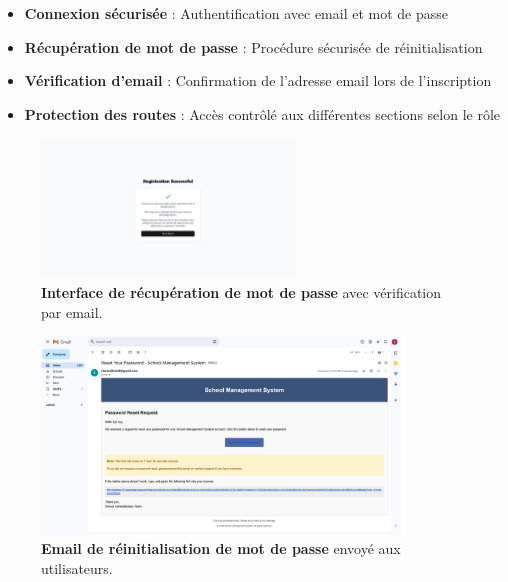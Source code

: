 \begin{itemize}
  \item \textbf{Connexion sécurisée} : Authentification avec email et mot de passe
  
  \item \textbf{Récupération de mot de passe} : Procédure sécurisée de réinitialisation
  
  \item \textbf{Vérification d'email} : Confirmation de l'adresse email lors de l'inscription
  
  \item \textbf{Protection des routes} : Accès contrôlé aux différentes sections selon le rôle
\end{itemize}

\begin{figure}[H]
  \centering
  \includegraphics[width=0.6\textwidth,keepaspectratio]{pfe-pics/auth/Screenshot 2025-06-09 at 23-02-10 Vite React TS.png}
  \caption{\textbf{Interface de récupération de mot de passe} avec vérification par email.}
  \label{fig:password_reset}
\end{figure}

\begin{figure}[H]
  \centering
  \includegraphics[width=0.85\textwidth,keepaspectratio]{pfe-pics/auth/Screenshot 2025-06-09 at 23-08-41 Reset Your Password - School Management System - vertigoevilman1@gmail.com - Gmail.png}
  \caption{\textbf{Email de réinitialisation de mot de passe} envoyé aux utilisateurs.}
  \label{fig:password_reset_email}
\end{figure}

